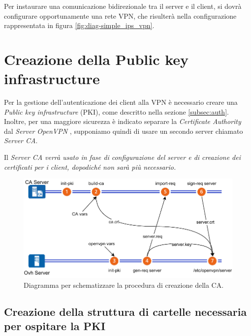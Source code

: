 Per instaurare una comunicazione bidirezionale tra il server e il client, si dovrà configurare opportunamente una rete VPN, che risulterà nella configurazione rappresentata in figura \ref{fig:diag-simple_ips_vpn}.

\section{Creazione della Public key infrastructure}
\label{sec:pki_ca}
\workinprogress

Per la gestione dell'autenticazione dei client alla VPN è necessario creare una \textit{Public key infrastructure} (PKI), come descritto nella sezione \ref{subsec:auth}. Inoltre, per una maggiore sicurezza è indicato separare la \textit{Certificate Authority} dal \textit{Server OpenVPN} \cite{openvpn-as-ca}, supponiamo quindi di usare un secondo server chiamato \textit{Server CA}. 

Il \it{Server CA} verrà usato in fase di configurazione del server e di creazione dei certificati per i client, dopodiché non sarà più necessario.

\begin{figure}[H]
    \centering
    \includegraphics[width=1\linewidth]{immagini/diag-firma_certificato_ca}
    \caption{Diagramma per schematizzare la procedura di creazione della CA.}
    \label{fig:diag-firma_certificato_ca}
\end{figure}


\subsection{Creazione della struttura di cartelle necessaria per ospitare la PKI}
\label{subsec:pki_structure}

